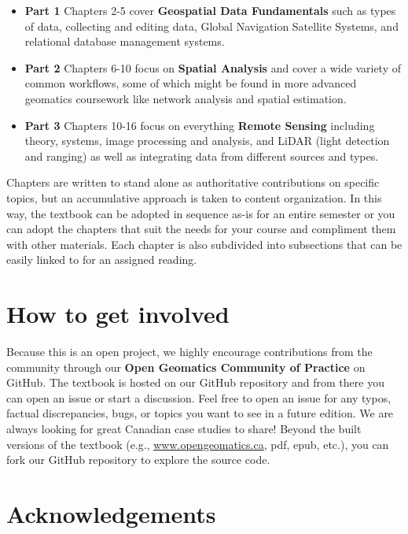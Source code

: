 \documentclass[
]{book}
\providecommand{\tightlist}{%
  \setlength{\itemsep}{0pt}\setlength{\parskip}{0pt}}
\begin{document}
\begin{itemize}
\tightlist
\item
  \textbf{Part 1} Chapters 2-5 cover \textbf{Geospatial Data Fundamentals} such as types of data, collecting and editing data, Global Navigation Satellite Systems, and relational database management systems.
\item
  \textbf{Part 2} Chapters 6-10 focus on \textbf{Spatial Analysis} and cover a wide variety of common workflows, some of which might be found in more advanced geomatics coursework like network analysis and spatial estimation.
\item
  \textbf{Part 3} Chapters 10-16 focus on everything \textbf{Remote Sensing} including theory, systems, image processing and analysis, and LiDAR (light detection and ranging) as well as integrating data from different sources and types.
\end{itemize}

Chapters are written to stand alone as authoritative contributions on specific topics, but an accumulative approach is taken to content organization. In this way, the textbook can be adopted in sequence as-is for an entire semester or you can adopt the chapters that suit the needs for your course and compliment them with other materials. Each chapter is also subdivided into subsections that can be easily linked to for an assigned reading.

\hypertarget{how-to-get-involved}{%
\section*{How to get involved}\label{how-to-get-involved}}

Because this is an open project, we highly encourage contributions from the community through our \textbf{Open Geomatics Community of Practice} on GitHub. The textbook is hosted on our GitHub repository and from there you can open an issue or start a discussion. Feel free to open an issue for any typos, factual discrepancies, bugs, or topics you want to see in a future edition. We are always looking for great Canadian case studies to share! Beyond the built versions of the textbook (e.g., \href{http://www.opengeomatics.ca}{www.opengeomatics.ca}, pdf, epub, etc.), you can fork our GitHub repository to explore the source code.

\hypertarget{acknowledgements}{%
\section*{Acknowledgements}\label{acknowledgements}}
\end{document}
